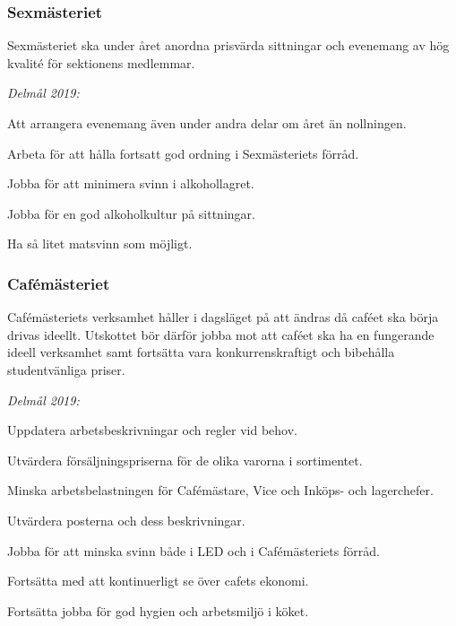 \documentclass[../_main/handlingar.tex]{subfiles}
\begin{document}
\subsubsection*{Sexmästeriet}
Sexmästeriet ska under året anordna prisvärda sittningar och evenemang av hög kvalité för sektionens medlemmar. 

\emph{Delmål 2019:}
\begin{dashlist}
	\item Att arrangera evenemang även under andra delar om året än nollningen.
	\item Arbeta för att hålla fortsatt god ordning i Sexmästeriets förråd.
	\item Jobba för att minimera svinn i alkohollagret. 
	\item Jobba för en god alkoholkultur på sittningar.
	\item Ha så litet matsvinn som möjligt. 


\end{dashlist}

\subsubsection*{Cafémästeriet}
Cafémästeriets verksamhet håller i dagsläget på att ändras då caféet ska börja drivas ideellt. Utskottet bör därför jobba mot att caféet ska ha en fungerande ideell verksamhet samt fortsätta vara konkurrenskraftigt och bibehålla studentvänliga priser.

\emph{Delmål 2019:}
\begin{dashlist}
	\item Uppdatera arbetsbeskrivningar och regler vid behov. 
	\item Utvärdera försäljningspriserna för de olika varorna i sortimentet. 
	\item Minska arbetsbelastningen för Cafémästare, Vice och Inköps- och lagerchefer.
	\item Utvärdera posterna och dess beskrivningar.
	\item Jobba för att minska svinn både i LED och i Cafémästeriets förråd.
    \item Fortsätta med att kontinuerligt se över cafets ekonomi. 
    \item Fortsätta jobba för god hygien och arbetsmiljö i köket.
\end{dashlist}
\end{document}
